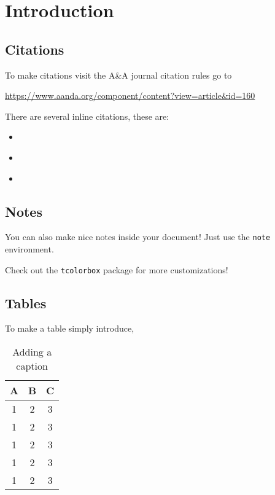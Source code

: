\documentclass[../main/thesis_msc.tex]{subfiles}
\begin{document}
    \chapter{Introduction}

    \section{Citations}
    To make citations visit the A\&A journal citation rules go to

    \url{https://www.aanda.org/component/content?view=article&id=160}

    There are several inline citations, these are:
    \begin{itemize}
        \item \citep{bracewell1978fourier}
        \item \citet{bracewell1978fourier}
        \item \citep[see][]{bracewell1978fourier}
    \end{itemize}


    \section{Notes}
    You can also make nice notes inside your document! Just use the \texttt{note} environment.

    \begin{note}
        \blindtext %
    \end{note}

    \noindent Check out the \texttt{tcolorbox} package for more customizations!

    \section{Tables}

    To make a table simply introduce,

    \begin{table}[t]
        \centering
        \begin{tabular}{ccc}
            \toprule
            \textbf{A} & \textbf{B} & \textbf{C} \\ \midrule
            1 & 2 & 3 \\
            1 & 2 & 3 \\
            1 & 2 & 3 \\
            1 & 2 & 3 \\
            1 & 2 & 3 \\
            \bottomrule
        \end{tabular}
        \caption{Adding a caption}
        \label{tab:my_table}
    \end{table}
\end{document}
